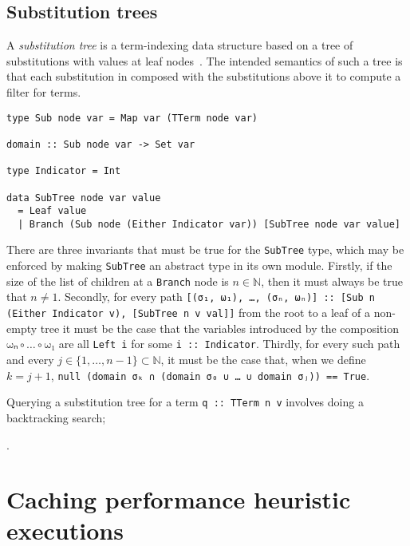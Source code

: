 \documentclass[11pt]{report}
\newcommand{\haskell}[1]{\texttt{#1}}
\newcommand{\mbb}[1]{\ensuremath{\mathbb{#1}}}     %
\newcommand{\sfixme}[0]{%
  \begin{minipage}[c]{3.5em}%
  \todo[color=green!40,inline]{\textsc{fixme}}%
  \end{minipage}}
\newcommand{\comp}[0]{\circ}
\begin{document}
\subsection{Substitution trees}
\label{sec:substitution-trees}

A \textit{substitution tree} is a term-indexing data structure based on a tree
of substitutions with values at leaf nodes~\cite{graf-1994,handbook-ch26}.
The intended semantics of such a tree is that each substitution in composed
with the substitutions above it to compute a filter for terms.

\vspace{-0.5em}
\begin{verbatim}
type Sub node var = Map var (TTerm node var)

domain :: Sub node var -> Set var

type Indicator = Int

data SubTree node var value
  = Leaf value
  | Branch (Sub node (Either Indicator var)) [SubTree node var value]
\end{verbatim}
\vspace{0em}

There are three invariants that must be true for the \haskell{SubTree} type,
which may be enforced by making \haskell{SubTree} an abstract type in its own
module. Firstly, if the size of the list of children at a \haskell{Branch} node
is $n \in \mbb{N}$, then it must always be true that $n \neq 1$. Secondly, for
every path
\texttt{[(\haskell{σ₁}, \haskell{ω₁}), …, (\haskell{σₙ}, \haskell{ωₙ})] \haskell{::} \haskell{[Sub n (Either Indicator v), [SubTree n v val]]}}
from the root to a leaf of a non-empty tree it must be the case that the
variables introduced by the composition $\haskell{ωₙ} \comp \ldots \comp \haskell{ω₁}$ are
all \texttt{\haskell{Left} \haskell{i}} for some \haskell{i :: Indicator}.
Thirdly, for every such path and every $j \in \{1, \ldots, n - 1\} \subset \mbb{N}$,
it must be the case that, when we define $k = j + 1$,
\texttt{\haskell{null} (\haskell{domain} \haskell{σₖ} ∩ (\haskell{domain} \haskell{σ₀} ∪ … ∪ \haskell{domain} \haskell{σⱼ})) \haskell{==} \haskell{True}}.

Querying a substitution tree for a term \haskell{q :: TTerm n v} involves doing
a backtracking search; \sfixme{}.

\section{Caching performance heuristic executions}
\label{sec:heuristic-caching}
\end{document}
